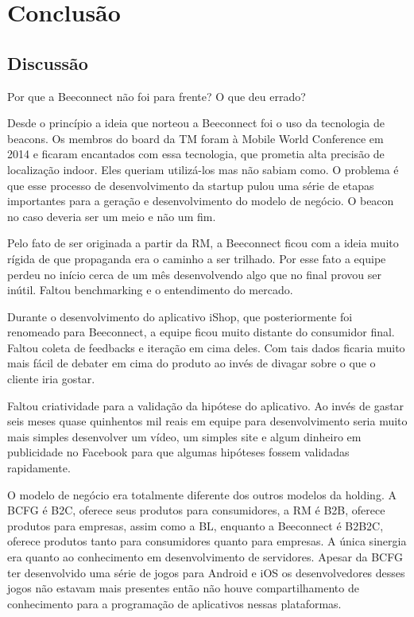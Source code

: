 \chapter{Conclusão}

\section{Discussão} %
\label{sec:discussao}
Por que a Beeconnect não foi para frente? O que deu errado?

Desde o princípio a ideia que norteou a Beeconnect foi o uso da tecnologia de beacons. Os membros do board da TM foram à Mobile World Conference em 2014 e ficaram encantados com essa tecnologia, que prometia alta precisão de localização indoor. Eles queriam utilizá-los mas não sabiam como. O problema é que esse processo de desenvolvimento da startup pulou uma série de etapas importantes para a geração e desenvolvimento do modelo de negócio. O beacon no caso deveria ser um meio e não um fim.

Pelo fato de ser originada a partir da RM, a Beeconnect ficou com a ideia muito rígida de que propaganda era o caminho a ser trilhado. Por esse fato a equipe perdeu no início cerca de um mês desenvolvendo algo que no final provou ser inútil. Faltou benchmarking e o entendimento do mercado.

Durante o desenvolvimento do aplicativo iShop, que posteriormente foi renomeado para Beeconnect, a equipe ficou muito distante do consumidor final. Faltou coleta de feedbacks e iteração em cima deles. Com tais dados ficaria muito mais fácil de debater em cima do produto ao invés de divagar sobre o que o cliente iria gostar.

Faltou criatividade para a validação da hipótese do aplicativo. Ao invés de gastar seis meses quase quinhentos mil reais em equipe para desenvolvimento seria muito mais simples desenvolver um vídeo, um simples site e algum dinheiro em publicidade no Facebook para que algumas hipóteses fossem validadas rapidamente.

O modelo de negócio era totalmente diferente dos outros modelos da holding. A BCFG é B2C, oferece seus produtos para consumidores, a RM é B2B, oferece produtos para empresas, assim como a BL, enquanto a Beeconnect é B2B2C, oferece produtos tanto para consumidores quanto para empresas. A única sinergia era quanto ao conhecimento em desenvolvimento de servidores. Apesar da BCFG ter desenvolvido uma série de jogos para Android e iOS os desenvolvedores desses jogos não estavam mais presentes então não houve compartilhamento de conhecimento para a programação de aplicativos nessas plataformas.

